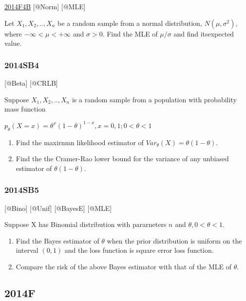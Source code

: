 \documentclass[6pt,Portrait]{article}
\begin{document}
\protect\hyperlink{f4b-1}{2014F4B} {[}@Norm{]} {[}@MLE{]}

Let \(X_1,X_2,..,X_{n}\) be a random sample from a normal distribution,
\(N(\mu,\sigma^2)\), where \(-\infty<\mu<+\infty\) and \(\sigma>0\).
Find the MLE of \(\mu/\sigma\) and find itsexpected value.

\hypertarget{sb4-1}{%
\subsubsection{2014SB4}\label{sb4-1}}

{[}@Beta{]} {[}@CRLB{]}

Suppose \(X_1,X_2,..,X_{n}\) is a random sample from a population with
probability mass function

\(p_\theta(X=x)=\theta^{x}(1-\theta)^{1-x},x=0,1; 0<\theta<1\)

\begin{enumerate}
\def\labelenumi{(\alph{enumi})}
\item
  Find the maxirnmn likelihood estimator of
  \(Var_\theta(X) =\theta(1-\theta)\).
\item
  Find the the Cramer-Rao lower bound for the variance of any unbiased
  estimator of \(\theta(1-\theta)\).
\end{enumerate}

\hypertarget{sb5}{%
\subsubsection{2014SB5}\label{sb5}}

{[}@Bino{]} {[}@Unif{]} {[}@BayesE{]} {[}@MLE{]}

Suppose X has Binomial distribution with pararneters \(n\) and
\(\theta, 0<\theta<1\).

\begin{enumerate}
\def\labelenumi{(\alph{enumi})}
\item
  Find the Bayes estimator of \(\theta\) when the prior distribution is
  uniform on the interval \((0,1)\) and the loss function is square
  error loss function.
\item
  Compare the risk of the above Bayes estimator with that of the MLE of
  \(\theta\).
\end{enumerate}

\hypertarget{f-9}{%
\subsection{2014F}\label{f-9}}
\end{document}
